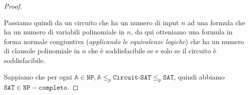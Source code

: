 \begin{proof}
\begin{enumerate}
            Passiamo quindi da un circuito che ha un numero di input $n$ ad una 
            formula che ha un numero di variabili polinomiale in $n$, da qui 
            otteniamo una formula in forma normale congiuntiva (\textit{applicando 
            le equivalenze logiche}) che ha un numero di clausole polinomiale in $n$ 
            che è soddisfacibile se e solo se il circuito è soddisfacibile.
    \end{enumerate}
    Sappiamo che per ogni $\mathbb{A} \in \texttt{NP}, \mathbb{A}
    \leq_p \texttt{Circuit-SAT} \leq_p \texttt{SAT}$, quindi abbiamo 
    $\texttt{SAT} \in \texttt{NP}-\texttt{completo}$.
\end{proof}